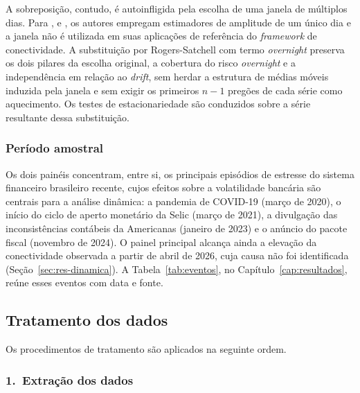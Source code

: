\documentclass[12pt, a4paper, oneside, english, brazil]{abntex2}
\begin{document}
A sobreposição, contudo, é autoinfligida pela escolha de uma janela de múltiplos dias. 
Para \textcite{diebold2012}, \textcite{diebold2014} e \textcite{demirer2018}, os autores 
empregam estimadores de amplitude de um único dia e a janela não é utilizada em suas 
aplicações de referência do \textit{framework} de conectividade. A
substituição por Rogers-Satchell com termo \textit{overnight} preserva os dois
pilares da escolha original, a cobertura do risco \textit{overnight} e a
independência em relação ao \textit{drift}, sem herdar a estrutura de médias
móveis induzida pela janela e sem exigir os primeiros $n-1$ pregões de cada
série como aquecimento. Os testes de estacionariedade  
são conduzidos sobre a série resultante dessa substituição.

\subsubsection*{Período amostral}

Os dois painéis concentram, entre si, os principais episódios de estresse do sistema
financeiro brasileiro recente, cujos efeitos sobre a volatilidade bancária são centrais para
a análise dinâmica: a pandemia de COVID-19 (março de 2020), o início do ciclo de aperto
monetário da Selic (março de 2021), a divulgação das inconsistências contábeis da Americanas
(janeiro de 2023) e o anúncio do pacote fiscal (novembro de 2024). O painel principal alcança
ainda a elevação da conectividade observada a partir de abril de 2026, cuja causa não foi
identificada (Seção~\ref{sec:res-dinamica}). A Tabela~\ref{tab:eventos}, no
Capítulo~\ref{cap:resultados}, reúne esses eventos com data e fonte.


\subsection*{Tratamento dos dados}

Os procedimentos de tratamento são aplicados na seguinte ordem.

\subsubsection*{1.\ Extração dos dados}
\end{document}
